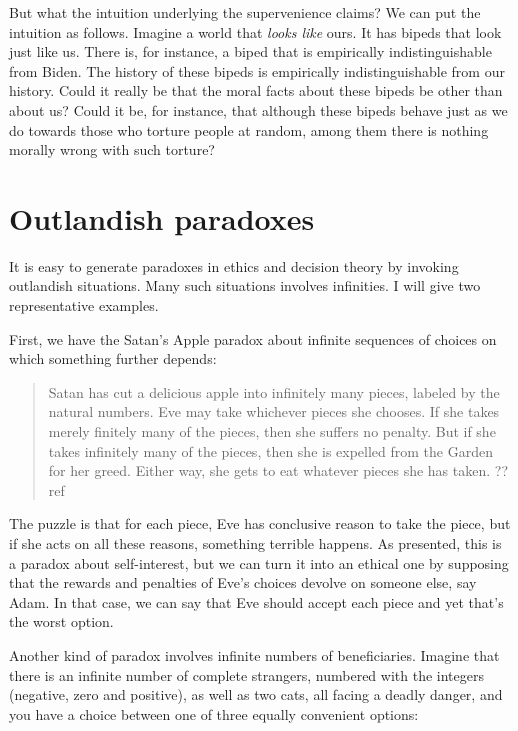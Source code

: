 But what the intuition underlying the supervenience claims? We can put the intuition as follows.
Imagine a world that \textit{looks like} ours. It has bipeds that look just like us. There is,
for instance, a biped that is empirically indistinguishable from Biden. The history of these bipeds
is empirically indistinguishable from our history. Could it really be that the moral facts about
these bipeds be other than about us? Could it be, for instance, that although these bipeds behave just
as we do towards those who torture people at random, among them there is nothing morally wrong with
such torture?

\section{Outlandish paradoxes}
It is easy to generate paradoxes in ethics and decision theory by invoking outlandish situations.
Many such situations involves infinities. I will give two representative examples.

First, we have the Satan's Apple paradox about infinite sequences of choices on which something
further depends:
\begin{quote}
Satan has cut a delicious apple into infinitely many pieces, labeled by the natural numbers. Eve
may take whichever pieces she chooses. If she takes merely finitely many of the pieces, then she
suffers no penalty. But if she takes infinitely many of the pieces, then she is expelled from the
Garden for her greed. Either way, she gets to eat whatever pieces she has taken. ??ref
\end{quote}
The puzzle is that for each piece, Eve has conclusive reason to take the piece, but if she acts on
all these reasons, something terrible happens. As presented, this is a paradox about self-interest, 
but we can turn it into an ethical one by supposing that the rewards and penalties of Eve's choices 
devolve on someone else, say Adam. In that case, we can say that Eve should accept each piece and yet
that's the worst option.

Another kind of paradox involves infinite numbers of beneficiaries. Imagine that there is an infinite
number of complete strangers, numbered with the integers (negative, zero and positive),
as well as two cats, all facing a deadly danger, and you have a choice between one of three equally convenient options:

